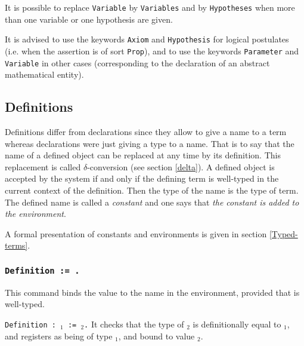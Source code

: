  It is possible to replace {\tt Variable} by
{\tt Variables} and  by {\tt Hypotheses}
 when more than one variable or one hypothesis are given.

It is advised to use the keywords \verb:Axiom: and \verb:Hypothesis:
for logical postulates (i.e. when the assertion {\term} is of sort
\verb:Prop:), and to use the keywords \verb:Parameter: and
\verb:Variable: in other cases (corresponding to the declaration of an
abstract mathematical entity).

\subsection{Definitions}\label{Simpl-definitions}
Definitions differ from declarations since they allow to give a name
to a term whereas declarations were just giving a type to a name. That
is to say that the name of a defined object can be replaced at any
time by its definition.  This replacement is called
$\delta$-conversion (see section
\ref{delta}).  A defined object is accepted by the system if and only if the
defining term is well-typed in the current context of the definition.
Then the type of the name is the type of term. The defined name is
called a {\em constant} and one says that {\it the
  constant is added to the environment}.

A formal presentation of constants and environments is given in
section \ref{Typed-terms}.


\subsubsection{\tt Definition {\ident} := {\term}.}
This command binds the value {\term} to the name {\ident} in the
environment, provided that {\term} is well-typed.

\begin{ErrMsgs}
\item {}
\end{ErrMsgs}

\begin{Variants}
\item {\tt Definition {\ident} : {\term$_1$} := {\term$_2$}.} It
  checks that the type of {\term$_2$} is definitionally equal to
  {\term$_1$}, and registers {\ident} as being of type {\term$_1$},
  and bound to value {\term$_2$}.
\end{Variants}

